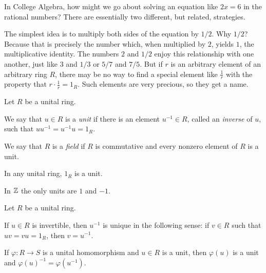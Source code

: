 In College Algebra, how might we go about solving an equation like \(2x = 6\) in the rational numbers? There are essentially two different, but related, strategies.

The simplest idea is to multiply both sides of the equation by \(1/2\).
Why \(1/2\)? Because that is precisely the number which, when multiplied by \(2\), yields \(1\), the multiplicative identity.
The numbers \(2\) and \(1/2\) enjoy this relationship with one another, just like \(3\) and \(1/3\) or \(5/7\) and \(7/5\).
But if \(r\) is an arbitrary element of an arbitrary ring \(R\), there may be no way to find a special element like \(\frac{1}{r}\) with the property that \(r \cdot \frac{1}{r} = 1_R\).
Such elements are very precious, so they get a name.

\begin{dfn}[Unit] \label{dfn:unit-field}
Let \(R\) be a unital ring.
\begin{proplist}
\item We say that \(u \in R\) is a \emph{unit} if there is an element \(u^{-1} \in R\), called an \emph{inverse} of \(u\), such that \(uu^{-1} = u^{-1}u = 1_R\).
\item We say that \(R\) is a \emph{field} if \(R\) is commutative and every nonzero element of \(R\) is a unit.
\end{proplist}
\end{dfn}

\begin{examples}
\item In any unital ring, \(1_R\) is a unit.

\item In \(\mathbb{Z}\) the only units are \(1\) and \(-1\).
\end{examples}

\begin{prop} \label{prop:unit-basics}
Let \(R\) be a unital ring.
\begin{proplist}
\item \label{prop:unit-basics:unique} If \(u \in R\) is invertible, then \(u^{-1}\) is unique in the following sense: if \(v \in R\) such that \(uv = vu = 1_R\), then \(v = u^{-1}\).
\item If \(\varphi : R \rightarrow S\) is a unital homomorphism and \(u \in R\) is a unit, then \(\varphi(u)\) is a unit and \(\varphi(u)^{-1} = \varphi(u^{-1})\).
\end{proplist}
\end{prop}


